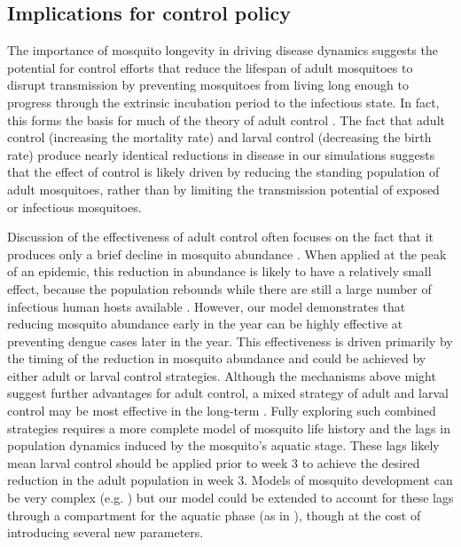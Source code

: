 \documentclass[10pt,letterpaper]{article}
\begin{document}
\subsection*{Implications for control policy}

The importance of mosquito longevity in driving disease dynamics suggests the potential for control efforts that reduce the lifespan of adult mosquitoes to disrupt transmission by preventing mosquitoes from living long enough to progress through the extrinsic incubation period to the infectious state.
In fact, this forms the basis for much of the theory of adult control \cite{Burattini2008, Morrison2008, Smith2012}.
The fact that adult control (increasing the mortality rate) and larval control (decreasing the birth rate) produce nearly identical reductions in disease in our simulations suggests that the effect of control is likely driven by reducing the standing population of adult mosquitoes, rather than by limiting the transmission potential of exposed or infectious mosquitoes.

Discussion of the effectiveness of adult control often focuses on the fact that it produces only a brief decline in mosquito abundance \cite{Newton1992, Esu2010}.
When applied at the peak of an epidemic, this reduction in abundance is likely to have a relatively small effect, because the population rebounds while there are still a large number of infectious human hosts available \cite{Newton1992, Burattini2008}. 
However, our model demonstrates that reducing mosquito abundance early in the year can be highly effective at preventing dengue cases later in the year.
This effectiveness is driven primarily by the timing of the reduction in mosquito abundance and could be achieved by either adult or larval control strategies.
Although the mechanisms above might suggest further advantages for adult control, a mixed strategy of adult and larval control may be most effective in the long-term \cite{Burattini2008, Pinho2010}.
Fully exploring such combined strategies requires a more complete model of mosquito life history and the lags in population dynamics induced by the mosquito's aquatic stage.
These lags likely mean larval control should be applied prior to week 3 to achieve the desired reduction in the adult population in week 3.
Models of mosquito development can be very complex (e.g. \cite{Magori2009}) but our model could be extended to account for these lags through a compartment for the aquatic phase (as in \cite{Burattini2008, Pinho2010}), though at the cost of introducing several new parameters.
\end{document}
